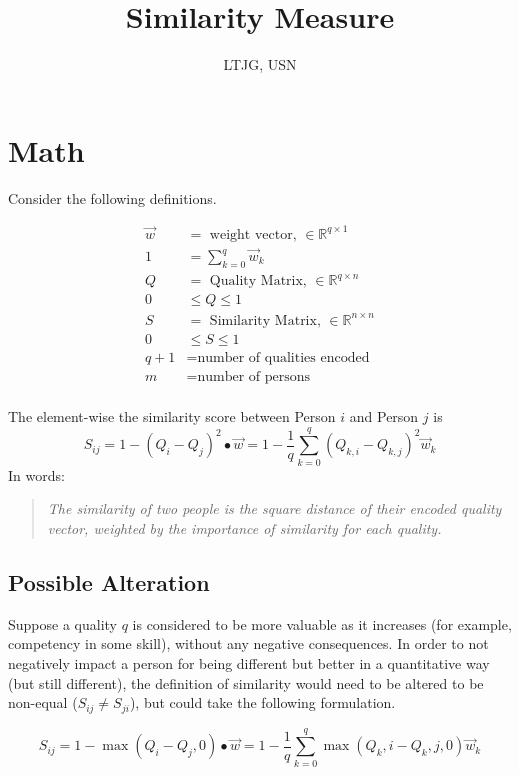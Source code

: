\documentclass{article}
\title{Similarity Measure}
\author{\studentname \qquad LTJG, USN}
\begin{document}
\maketitle

\section{Math}

Consider the following definitions.

\begin{align}
\vec{w} &= \text{ weight vector, } \in \mathbb{R}^{q \times 1} \\
1 &= \sum_{k=0}^{q} \vec{w}_k\\
Q &= \text{ Quality Matrix, } \in \mathbb{R}^{q \times n} \\
0 & \leq Q \leq 1 \\
S &= \text{ Similarity Matrix, } \in \mathbb{R}^{n \times n} \\
0 & \leq S \leq 1 \\
q + 1 &= \text{number of qualities encoded}\\
m &= \text{number of persons}\\
\end{align}

The element-wise the similarity score between Person $i$ and Person $j$ is
\[S_{ij} = 1- (Q_i - Q_j)^2\bullet \vec{w} =  1 - \frac{1}{q}\sum_{k=0}^{q} (Q_{k,i} - Q_{k,j})^2\vec{w}_k\]
In words:
\begin{quote}
\textit{The similarity of two people is the square distance of their encoded quality vector, weighted by the importance of similarity for each quality.}
\end{quote}

\subsection{Possible Alteration}

Suppose a quality $q$ is considered to be more valuable as it increases (for example, competency in some skill), without any negative consequences. In order to not negatively impact a person for being different but better in a quantitative way (but still different), the definition of similarity would need to be altered to be non-equal ($S_{ij} \neq S_{ji}$), but could take the following formulation.

\[S_{ij} = 1- \max(Q_i - Q_j, 0) \bullet \vec{w} =  1 - \frac{1}{q}\sum_{k=0}^{q} \max(Q_k,i - Q_k,j, 0)\vec{w}_k\]
\end{document}
